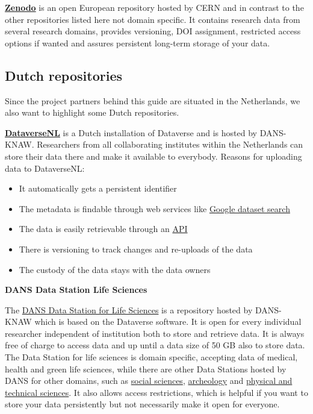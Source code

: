 \documentclass[
  oneside]{book}
\begin{document}
\href{https://zenodo.org/}{\textbf{Zenodo}} is an open European repository hosted by CERN and in contrast to the other repositories listed here not domain specific. It contains research data from several research domains, provides versioning, DOI assignment, restricted access options if wanted and assures persistent long-term storage of your data.

\subsection{Dutch repositories}\label{dutch-repositories}

Since the project partners behind this guide are situated in the Netherlands, we also want to highlight some Dutch repositories.

\textbf{\href{https://dataverse.nl/}{DataverseNL}} is a Dutch installation of Dataverse and is hosted by DANS-KNAW. Researchers from all collaborating institutes within the Netherlands can store their data there and make it available to everybody. Reasons for uploading data to DataverseNL:

\begin{itemize}
\item
  It automatically gets a persistent identifier
\item
  The metadata is findable through web services like \href{https://datasetsearch.research.google.com/}{Google dataset search}
\item
  The data is easily retrievable through an \hyperref[API]{API}
\item
  There is versioning to track changes and re-uploads of the data
\item
  The custody of the data stays with the data owners
\end{itemize}

\textbf{DANS Data Station Life Sciences}

The \href{https://dans.knaw.nl/en/life-sciences/}{DANS Data Station for Life Sciences} is a repository hosted by DANS-KNAW which is based on the Dataverse software. It is open for every individual researcher independent of institution both to store and retrieve data. It is always free of charge to access data and up until a data size of 50 GB also to store data. The Data Station for life sciences is domain specific, accepting data of medical, health and green life sciences, while there are other Data Stations hosted by DANS for other domains, such as \href{https://dans.knaw.nl/en/social-sciences-and-humanities/}{social sciences}, \href{https://dans.knaw.nl/en/archaeology/}{archeology} and \href{https://dans.knaw.nl/en/physical-and-technical-sciences/}{physical and technical sciences}. It also allows access restrictions, which is helpful if you want to store your data persistently but not necessarily make it open for everyone.
\end{document}

